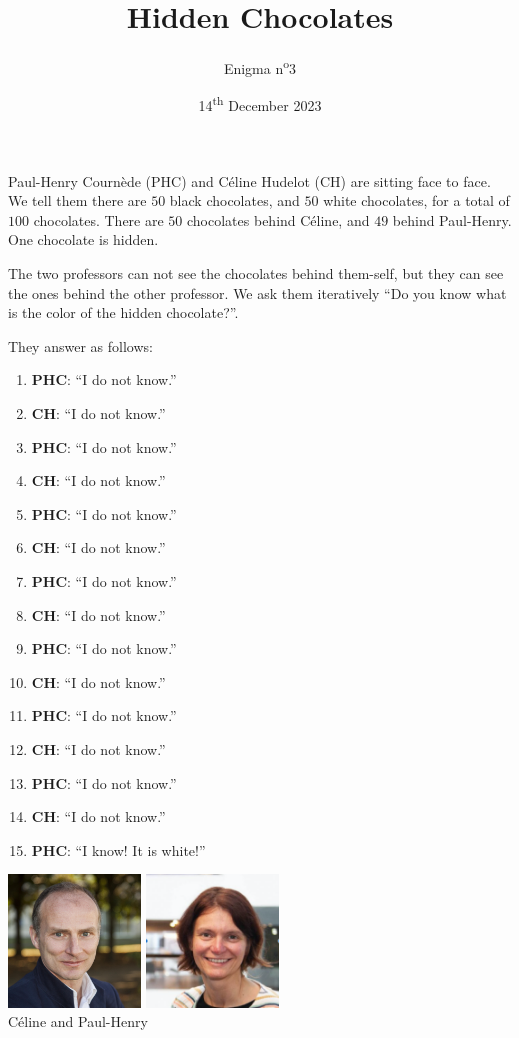 \documentclass[a4paper, top=10mm]{article}
\title{\textbf{\huge{Hidden Chocolates}}}
\author{Enigma n\textsuperscript{o}3}
\date{14\textsuperscript{th} December 2023}
\begin{document}
	\maketitle
	
	Paul-Henry Cournède (PHC) and Céline Hudelot (CH) are sitting face to face.
	We tell them there are $50$ black chocolates, and $50$ white chocolates, for a total of $100$ chocolates.
	There are $50$ chocolates behind Céline, and $49$ behind Paul-Henry.
	One chocolate is hidden.
	
	The two professors can not see the chocolates behind them-self, but they can see the ones behind the other professor.
	We ask them iteratively “Do you know what is the color of the hidden chocolate?”.
	
	They answer as follows:
	
	\begin{enumerate}
		\item \textbf{PHC}: “I do not know.”
		\item \textbf{CH}: “I do not know.”
		\item \textbf{PHC}: “I do not know.”
		\item \textbf{CH}: “I do not know.”
		\item \textbf{PHC}: “I do not know.”
		\item \textbf{CH}: “I do not know.”
		\item \textbf{PHC}: “I do not know.”
		\item \textbf{CH}: “I do not know.”
		\item \textbf{PHC}: “I do not know.”
		\item \textbf{CH}: “I do not know.”
		\item \textbf{PHC}: “I do not know.”
		\item \textbf{CH}: “I do not know.”
		\item \textbf{PHC}: “I do not know.”
		\item \textbf{CH}: “I do not know.”
		\item \textbf{PHC}: “I know! It is white!”
	\end{enumerate}
	
	\begin{center}
		\includegraphics[height=100pt]{03PHC.jpg}
		\includegraphics[height=100pt]{03CH.png}\\
		Céline and Paul-Henry
	\end{center}
	
\end{document}
